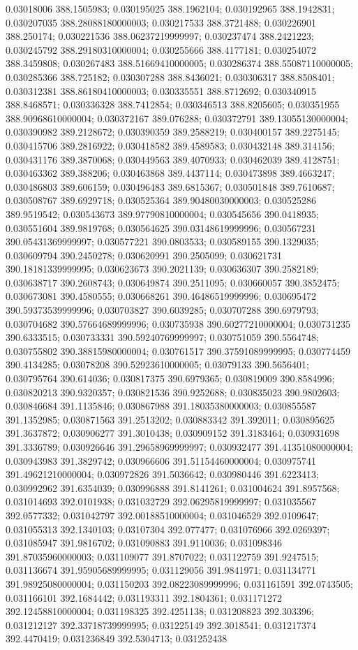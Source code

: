 0.03018006 388.1505983; 0.030195025 388.1962104; 0.030192965 388.1942831; 0.030207035 388.28088180000003; 0.030217533 388.3721488; 0.030226901 388.250174; 0.030221536 388.06237219999997; 0.030237474 388.2421223; 0.030245792 388.29180310000004; 0.030255666 388.4177181; 0.030254072 388.3459808; 0.030267483 388.51669410000005; 0.030286374 388.55087110000005; 0.030285366 388.725182; 0.030307288 388.8436021; 0.030306317 388.8508401; 0.030312381 388.86180410000003; 0.030335551 388.8712692; 0.030340915 388.8468571; 0.030336328 388.7412854; 0.030346513 388.8205605; 0.030351955 388.90968610000004; 0.030372167 389.076288; 0.030372791 389.13055130000004; 0.030390982 389.2128672; 0.030390359 389.2588219; 0.030400157 389.2275145; 0.030415706 389.2816922; 0.030418582 389.4589583; 0.030432148 389.314156; 0.030431176 389.3870068; 0.030449563 389.4070933; 0.030462039 389.4128751; 0.030463362 389.388206; 0.030463868 389.4437114; 0.030473898 389.4663247; 0.030486803 389.606159; 0.030496483 389.6815367; 0.030501848 389.7610687; 0.030508767 389.6929718; 0.030525364 389.90480030000003; 0.030525286 389.9519542; 0.030543673 389.97790810000004; 0.030545656 390.0418935; 0.030551604 389.9819768; 0.030564625 390.03148619999996; 0.030567231 390.05431369999997; 0.030577221 390.0803533; 0.030589155 390.1329035; 0.030609794 390.2450278; 0.030620991 390.2505099; 0.030621731 390.18181339999995; 0.030623673 390.2021139; 0.030636307 390.2582189; 0.030638717 390.2608743; 0.030649874 390.2511095; 0.030660057 390.3852475; 0.030673081 390.4580555; 0.030668261 390.46486519999996; 0.030695472 390.59373539999996; 0.030703827 390.6039285; 0.030707288 390.6979793; 0.030704682 390.57664689999996; 0.030735938 390.60277210000004; 0.030731235 390.6333515; 0.030733331 390.59240769999997; 0.030751059 390.5564748; 0.030755802 390.38815980000004; 0.030761517 390.37591089999995; 0.030774459 390.4134285; 0.03078208 390.52923610000005; 0.03079133 390.5656401; 0.030795764 390.614036; 0.030817375 390.6979365; 0.030819009 390.8584996; 0.030820213 390.9320357; 0.030821536 390.9252688; 0.030835023 390.9802603; 0.030846684 391.1135846; 0.030867988 391.18035380000003; 0.030855587 391.1352985; 0.030871563 391.2513202; 0.030883342 391.392011; 0.030895625 391.3637872; 0.030906277 391.3010438; 0.030909152 391.3183464; 0.030931698 391.3336789; 0.030926646 391.29658969999997; 0.030932477 391.41351080000004; 0.030943983 391.3829742; 0.030966606 391.51154460000004; 0.030975741 391.49621210000004; 0.030972826 391.5036642; 0.030980446 391.6223413; 0.030992962 391.6354039; 0.030996888 391.8141261; 0.031004624 391.8957568; 0.031014693 392.0101938; 0.031032729 392.06295819999997; 0.031035567 392.0577332; 0.031042797 392.00188510000004; 0.031046529 392.0109647; 0.031055313 392.1340103; 0.03107304 392.077477; 0.031076966 392.0269397; 0.031085947 391.9816702; 0.031090883 391.9110036; 0.031098346 391.87035960000003; 0.031109077 391.8707022; 0.031122759 391.9247515; 0.031136674 391.95905689999995; 0.031129056 391.9841971; 0.031134771 391.98925080000004; 0.031150203 392.08223089999996; 0.031161591 392.0743505; 0.031166101 392.1684442; 0.031193311 392.1804361; 0.031171272 392.12458810000004; 0.031198325 392.4251138; 0.031208823 392.303396; 0.031212127 392.33718739999995; 0.031225149 392.3018541; 0.031217374 392.4470419; 0.031236849 392.5304713; 0.031252438 